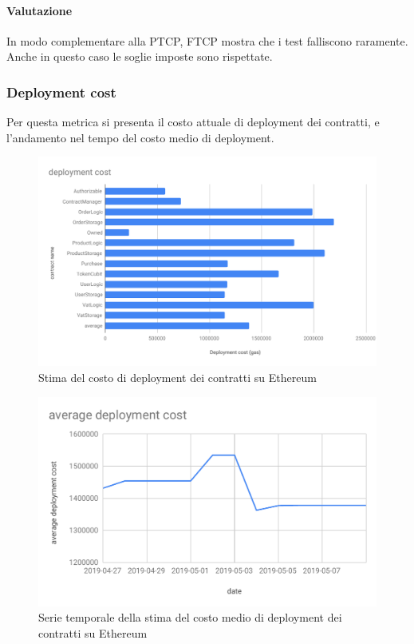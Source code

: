 \paragraph*{Valutazione}
In modo complementare alla PTCP, FTCP mostra che i test falliscono raramente. Anche in questo caso le soglie imposte sono rispettate.


\subsubsection{Deployment cost}
Per questa metrica si presenta il costo attuale di deployment dei contratti, e l'andamento nel tempo del costo medio di deployment.
\begin{figure}[H]
	\centering
	\includegraphics[scale=0.45]{res/images/RA/deployment-cost.pdf}
	\caption{Stima del costo di deployment dei contratti su Ethereum}
\end{figure}
\begin{figure}[H]
	\centering
	\includegraphics[scale=0.6]{res/images/RA/average-deployment-cost.pdf}
	\caption{Serie temporale della stima del costo medio di deployment dei contratti su Ethereum}
\end{figure}
